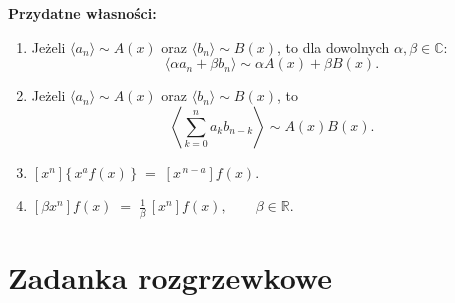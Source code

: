 \documentclass{lecture-kuznia}
\begin{document}
    \textbf{Przydatne własności:}\\
    \begin{enumerate}
        \item Jeżeli $\langle a_n \rangle \sim A(x)$ oraz $\langle b_n \rangle \sim B(x)$, to dla dowolnych $\alpha, \beta \in \mathbb{C}$:
\[
\langle \alpha a_n + \beta b_n \rangle \sim \alpha A(x) + \beta B(x).
\]
\item Jeżeli $\langle a_n \rangle \sim A(x)$ oraz $\langle b_n \rangle \sim B(x)$, to
\[
\left\langle \sum_{k=0}^{n} a_k b_{n-k} \right\rangle \sim A(x) B(x).
\]
\item \([x^n]\{\, x^a f(x) \,\} \;=\; [x^{\,n-a}] f(x).\)
\item \([\beta x^n] f(x) \;=\; \frac{1}{\beta}\,[x^n] f(x), 
\qquad \beta \in \mathbb{R}\).
    \end{enumerate} 
    
    
  \section{\huge{Zadanka rozgrzewkowe}}

	
 
\end{document}
